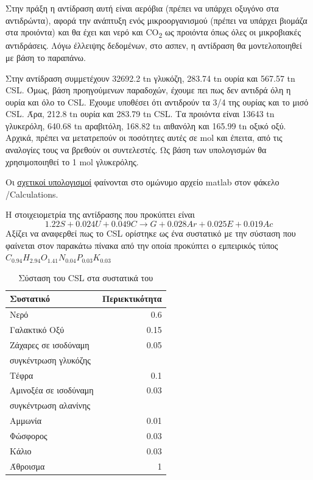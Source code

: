 \documentclass[11pt]{article}
\begin{document}
Στην πράξη η αντίδραση αυτή είναι αερόβια (πρέπει να υπάρχει οξυγόνο στα αντιδρώντα), αφορά την ανάπτυξη ενός μικροοργανισμού (πρέπει να υπάρχει βιομάζα στα προιόντα) και θα έχει και νερό και CO\textsubscript{2} ως προιόντα όπως όλες οι μικροβιακές αντιδράσεις. Λόγω έλλειψης δεδομένων, στο ασπεν, η αντίδραση θα μοντελοποιηθεί με βάση το παραπάνω.

Στην αντίδραση συμμετέχουν 32692.2 tn γλυκόζη, 283.74 tn ουρία και 567.57 tn CSL. Όμως, βάση προηγούμενων παραδοχών, έχουμε πει πως δεν αντιδρά όλη η ουρία και όλο το CSL. Έχουμε υποθέσει ότι αντιδρούν τα 3/4 της ουρίας και το μισό CSL. Άρα, 212.8 tn ουρία και 283.79 tn CSL. Τα προιόντα είναι 13643 tn γλυκερόλη, 640.68 tn αραβιτόλη, 168.82 tn αιθανόλη και 165.99 tn οξικό οξύ. Αρχικά, πρέπει να μετατρεπούν οι ποσότητες αυτές σε mol και έπειτα, από τις αναλογίες τους να βρεθούν οι συντελεστές. Ως βάση των υπολογισμών θα χρησιμοποιηθεί το 1 mol γλυκερόλης.

Οι \href{https://github.com/Vidianos-Giannitsis/Process-Design/blob/master/Calculations/bioreactor\_stoichiometry.m}{σχετικοί υπολογισμοί} φαίνονται στο ομώνυμο αρχείο matlab στον φάκελο /Calculations.

Η στοιχειομετρία της αντίδρασης που προκύπτει είναι
\[ 1.22S + 0.024U + 0.049C \rightarrow G + 0.028Ar + 0.025E + 0.019Ac \]
Αξίζει να αναφερθεί πως το CSL ορίστηκε ως ένα συστατικό με την σύσταση που φαίνεται στον παρακάτω πίνακα από την οποία προκύπτει ο εμπειρικός τύπος
\(C_{0.94}H_{2.94}O_{1.41}N_{0.04}P_{0.03}K_{0.03}\)
\begin{table}[htbp]
\caption{Σύσταση του CSL στα συστατικά του}
\centering
\begin{tabular}{lr}
Συστατικό & Περιεκτικότητα\\
\hline
Νερό & 0.6\\
Γαλακτικό Οξύ & 0.15\\
Ζάχαρες σε ισοδύναμη & 0.05\\
συγκέντρωση γλυκόζης & \\
Τέφρα & 0.1\\
Αμινοξέα σε ισοδύναμη & 0.03\\
συγκέντρωση αλανίνης & \\
Αμμωνία & 0.01\\
Φώσφορος & 0.03\\
Κάλιο & 0.03\\
\hline
Άθροισμα & 1\\
\end{tabular}
\end{table}
\end{document}
